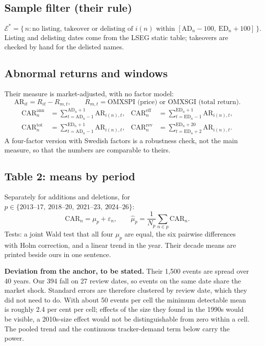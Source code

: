 \documentclass[11pt,a4paper]{article}
\newcommand{\AD}{\mathrm{AD}}
\newcommand{\ED}{\mathrm{ED}}
\newcommand{\CAR}{\mathrm{CAR}}
\newcommand{\AR}{\mathrm{AR}}
\begin{document}
\subsection{Sample filter (their rule)}
\begin{equation}
\mathcal{E}^* = \{\, n : \text{no listing, takeover or delisting of } i(n) \text{ within } [\AD_n - 100,\ \ED_n + 100] \,\}.
\end{equation}
Listing and delisting dates come from the LSEG static table; takeovers are checked by hand for the delisted names.

\subsection{Abnormal returns and windows}
Their measure is market-adjusted, with no factor model:
\begin{equation}
\AR_{it} = R_{it} - R_{m,t}, \qquad R_{m,t} = \text{OMXSPI (price) or OMXSGI (total return)}.
\end{equation}
\begin{align}
\CAR_n^{\text{ann}} &= \sum_{t=\AD_n-1}^{\AD_n+1} \AR_{i(n),t}, &
\CAR_n^{\text{eff}} &= \sum_{t=\ED_n-1}^{\ED_n+1} \AR_{i(n),t}, \\
\CAR_n^{\text{tot}} &= \sum_{t=\AD_n-1}^{\ED_n+1} \AR_{i(n),t}, &
\CAR_n^{\text{rev}} &= \sum_{t=\ED_n+2}^{\ED_n+20} \AR_{i(n),t}.
\end{align}
A four-factor version with Swedish factors is a robustness check, not the main measure, so that the numbers are comparable to theirs.

\subsection{Table 2: means by period}
Separately for additions and deletions, for $p \in \{2013\text{--}17,\ 2018\text{--}20,\ 2021\text{--}23,\ 2024\text{--}26\}$:
\begin{equation}
\CAR_n = \mu_p + \varepsilon_n, \qquad \hat\mu_p = \frac{1}{N_p}\sum_{n\in p}\CAR_n.
\end{equation}
Tests: a joint Wald test that all four $\mu_p$ are equal, the six pairwise differences with Holm correction, and a linear trend in the year. Their decade means are printed beside ours in one sentence.

\textbf{Deviation from the anchor, to be stated.} Their 1,500 events are spread over 40 years. Our 394 fall on 27 review dates, so events on the same date share the market shock. Standard errors are therefore clustered by review date, which they did not need to do. With about 50 events per cell the minimum detectable mean is roughly 2.4 per cent per cell; effects of the size they found in the 1990s would be visible, a 2010s-size effect would not be distinguishable from zero within a cell. The pooled trend and the continuous tracker-demand term below carry the power.
\end{document}
